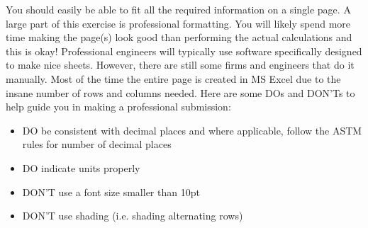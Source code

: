 \documentclass[12pt]{article}
\begin{document}
You should easily be able to fit all the required information on a single page. A large part of this exercise is professional formatting. You will likely spend more time making the page(s) look good than performing the actual calculations and this is okay! Professional engineers will typically use software specifically designed to make nice sheets. However, there are still some firms and engineers that do it manually. Most of the time the entire page is created in MS Excel due to the insane number of rows and columns needed. Here are some DOs and DON'Ts to help guide you in making a professional submission:

\begin{itemize}
    \item DO be consistent with decimal places and where applicable, follow the ASTM rules for number of decimal places
    \item DO indicate units properly
    \item DON'T use a font size smaller than 10pt
    \item DON'T use shading (i.e. shading alternating rows)
\end{itemize}


%
%

\pagebreak
\end{document}
